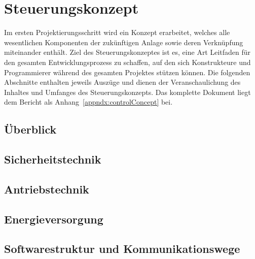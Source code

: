 

\chapter{Steuerungskonzept}
Im ersten Projektierungsschritt wird ein Konzept erarbeitet, welches alle wesentlichen Komponenten der zukünftigen Anlage sowie deren Verknüpfung miteinander enthält. Ziel des Steuerungskonzeptes ist es, eine Art Leitfaden für den gesamten Entwicklungsprozess zu schaffen, auf den sich Konstrukteure und Programmierer während des gesamten Projektes stützen können.
Die folgenden Abschnitte enthalten jeweils Auszüge und dienen der Veranschaulichung des Inhaltes und Umfanges des Steuerungskonzepts. Das komplette Dokument liegt dem Bericht als Anhang~\ref{appndx:controlConcept} bei.

\section{Überblick}

\section{Sicherheitstechnik}

\section{Antriebstechnik}

\section{Energieversorgung}

\section{Softwarestruktur und Kommunikationswege}
